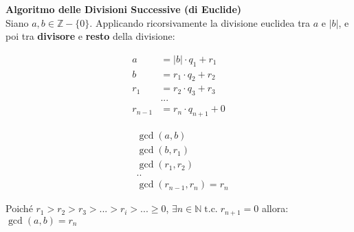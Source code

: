 \newpage
\textbf{Algoritmo delle Divisioni Successive (di Euclide)} \\
Siano $a, b \in \mathbb{Z} - \{0\}$. Applicando ricorsivamente la divisione euclidea tra $a$ e $|b|$, e poi tra \textbf{divisore} e \textbf{resto} della divisione:

\begin{figure}[h]
    \centering
    \begin{minipage}[t]{0.45\textwidth}
        \centering
        \begin{align*}
            a &= |b| \cdot q_1 + r_1 \\
            b &= r_1 \cdot q_2 + r_2 \\
            r_1 &= r_2 \cdot q_3 + r_3 \\
            & ... \\
            r_{n - 1} &= r_n \cdot q_{n + 1} + 0
        \end{align*}
    \end{minipage}
    \begin{minipage}[t]{0.45\textwidth}
        \centering
        \begin{align*}
            & \gcd (a, b) \\
            & \gcd (b, r_1) \\
            & \gcd (r_1, r_2) \\
            & .. \\
            & \gcd (r_{n - 1}, r_n) = r_n
        \end{align*}
    \end{minipage}
\end{figure}
Poiché $r_1 > r_2 > r_3 > ... > r_i > ... \geq 0$, $\exists n \in \mathbb{N} \; \text{t.c.} \; r_{n + 1} = 0$ allora: $\gcd (a, b) = r_n$

